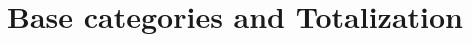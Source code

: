 \documentclass[Thesis.tex]{subfiles}
\begin{document}











\section{Base categories and Totalization}\label{categories}


\end{document}
